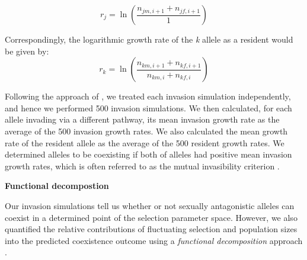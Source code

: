 \begin{equation}
r_{j} =	\ln \left ( \frac{n_{jm,i+1 } + n_{jf,i+1}}{1} \right )
\label{invader}
\end{equation}

Correspondingly, the logarithmic growth rate of the \textit{k} allele as a resident would be given by:
\begin{equation}
r_{k} =	\ln \left ( \frac{ n_{km,i+1} + n_{kf,i+1} }{ n_{km,i} + n_{kf,i}  } \right )
\label{resident}
\end{equation}

Following the approach of \citet{shoemaker2020}, we treated each invasion simulation independently, and hence we performed 500 invasion simulations. We then calculated, for each allele invading via a different pathway, its mean invasion growth rate as the average of the 500 invasion growth rates. We also calculated the mean growth rate of the resident allele as the average of the 500 resident growth rates. We determined alleles to be coexisting if both of alleles had positive mean invasion growth rates, which is often referred to as the mutual invasibility criterion \citep{barabas_chessons_2018}.

\vspace{5mm}
\noindent\textbf{Functional decompostion}

Our invasion simulations tell us whether or not sexually antagonistic alleles can coexist in a determined point of the selection parameter space. However, we also quantified the relative contributions of fluctuating selection and population sizes into the predicted coexistence outcome using a \textit{functional decomposition} approach \citep{ellner2016quantify,ellner_expanded_2019, shoemaker2020}.



